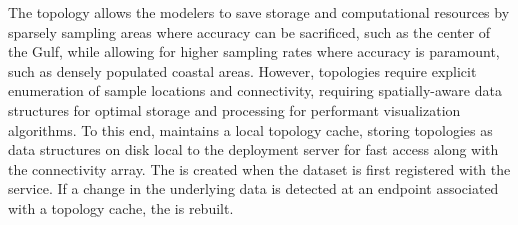 
The \ugrid{} topology allows the modelers to save storage and
computational resources by sparsely sampling areas where accuracy can
be sacrificed, such as the center of the Gulf, while allowing for
higher sampling rates where accuracy is paramount, such as densely
populated coastal areas. However, \ugrid{} topologies require explicit
enumeration of sample locations and connectivity, requiring
spatially-aware data structures for optimal storage and processing for
performant visualization algorithms. To this end, \sciwms{} maintains
a local topology cache, storing \ugrid{} topologies as
\rtree{}~\cite{Guttman84} data structures on disk local to the
deployment server for fast access along with the connectivity
array. The \rtree{} is created when the dataset is first registered
with the \sciwms{} service. If a change in the underlying data is
detected at an endpoint associated with a topology cache, the \rtree{}
is rebuilt.
